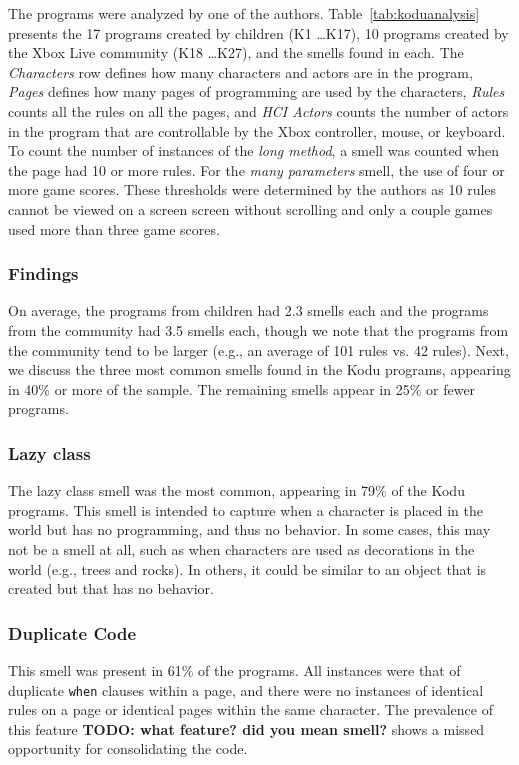 \documentclass{sig-alternate}
\newcommand{\todo}[1]{\textbf{TODO: #1}}
\begin{document}
The programs were analyzed  by one of the authors. Table~\ref{tab:koduanalysis} presents the 17 programs created by children (K1 \dots K17), 10 programs created by the Xbox Live community (K18 \dots K27), and the smells found in each. The \emph{Characters} row defines how many characters and actors are in the program, \emph{Pages} defines how many pages of programming are used by the characters, \emph{Rules} counts all the rules on all the pages, and \emph{HCI Actors} counts the number of actors in the program that are controllable by the Xbox controller, mouse, or keyboard. 
To count the number of instances of the \emph{long method}, a smell was counted when the page had 10 or more rules. For the  \emph{many parameters} smell, the use of four or more game scores. These thresholds were determined by the authors as 10 rules cannot be viewed on a screen screen without scrolling and only a couple games used more than three game scores. 

\subsubsection{Findings}
On average, the programs from children had 2.3 smells each and the programs from the community had 3.5 smells each, though we note that the programs from the community tend to be larger (e.g., an average of 101 rules vs. 42 rules). Next, we discuss the three most common smells found in the Kodu programs, appearing in 40\% or more of the sample. The remaining smells appear in 25\% or fewer programs. 

\subsubsection{Lazy class}
The lazy class smell was the most common, appearing in 79\% of the Kodu programs. This smell is intended to capture when a character is placed in the world but has no programming, and thus no behavior. In some cases, this may not be a smell at all, such as when characters are used as decorations in the world (e.g., trees and rocks). In others, it could be similar to an object that is created but that has no behavior. 

\subsubsection{Duplicate Code}
This smell was present in 61\% of the programs. All instances were that of duplicate {\tt when} clauses within a page, and there were no instances of identical rules on a page or identical pages within the same character. The prevalence of this feature \todo{what feature? did you mean smell?} shows a missed opportunity for consolidating the code. 
\end{document}
